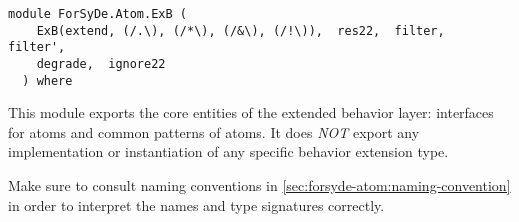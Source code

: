 \vspace{3ex}
\label{module:ForSyDe.Atom.ExB}
\haddockbeginheader
{\haddockverb\begin{verbatim}
module ForSyDe.Atom.ExB (
    ExB(extend, (/.\), (/*\), (/&\), (/!\)),  res22,  filter,  filter', 
    degrade,  ignore22
  ) where\end{verbatim}}
\haddockendheader

This module exports the core entities of the extended behavior
 layer: interfaces for atoms and common patterns of atoms. It does
 \emph{NOT} export any implementation or instantiation of any specific
 behavior extension type.\par
\begin{mdframed}[style=reminder,frametitle=Reminder]Make sure to consult naming conventions in  \cref{sec:forsyde-atom:naming-convention} in order to interpret the names and type signatures correctly.\end{mdframed}\par

